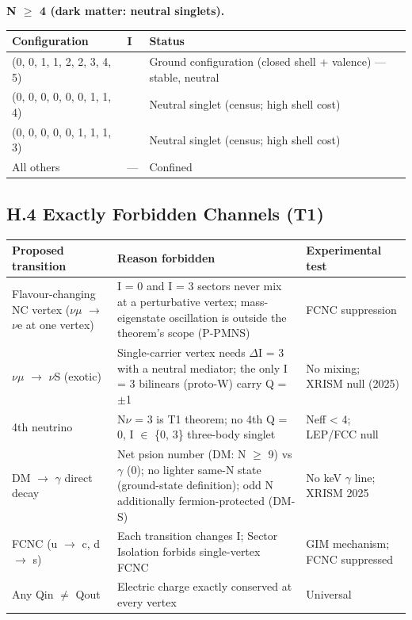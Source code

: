 \documentclass[11pt,letterpaper]{article}
\begin{document}
\noindent \textbf{N $\ge$ 4 (dark matter: neutral singlets).}

\begin{footnotesize}\begin{longtable}{|>{\raggedright\arraybackslash}p{}|>{\raggedright\arraybackslash}p{}|>{\raggedright\arraybackslash}p{}|}
\hline
\textbf{Configuration} & \textbf{I} & \textbf{Status} \\ \hline
(0, 0, 1, 1, 2, 2, 3, 4, 5) & 0 & Ground configuration (closed shell + valence) --- stable, neutral \\ \hline
(0, 0, 0, 0, 0, 0, 1, 1, 4) & 0 & Neutral singlet (census; high shell cost) \\ \hline
(0, 0, 0, 0, 0, 1, 1, 1, 3) & 0 & Neutral singlet (census; high shell cost) \\ \hline
All others & --- & Confined \\ \hline
\end{longtable}\end{footnotesize}

\subsection*{H.4  Exactly Forbidden Channels (T1)}

\begin{footnotesize}\begin{longtable}{|>{\raggedright\arraybackslash}p{}|>{\raggedright\arraybackslash}p{}|>{\raggedright\arraybackslash}p{}|}
\hline
\textbf{Proposed transition} & \textbf{Reason forbidden} & \textbf{Experimental test} \\ \hline
Flavour-changing NC vertex ($\nu$$\mu$ $\to$ $\nu$e at one vertex) & I = 0 and I = 3 sectors never mix at a perturbative vertex; mass-eigenstate oscillation is outside the theorem's scope (P-PMNS) & FCNC suppression \\ \hline
$\nu$$\mu$ $\to$ $\nu$S (exotic) & Single-carrier vertex needs $\Delta$I = 3 with a neutral mediator; the only I = 3 bilinears (proto-W) carry Q = $\pm$1 & No mixing; XRISM null (2025) \\ \hline
4th neutrino & N$\nu$ = 3 is T1 theorem; no 4th Q = 0, I $\in$ \{0, 3\} three-body singlet & Neff < 4; LEP/FCC null \\ \hline
DM $\to$ $\gamma$ direct decay & Net psion number (DM: N $\ge$ 9) vs $\gamma$ (0); no lighter same-N state (ground-state definition); odd N additionally fermion-protected (DM-S) & No keV $\gamma$ line; XRISM 2025 \\ \hline
FCNC (u $\to$ c, d $\to$ s) & Each transition changes I; Sector Isolation forbids single-vertex FCNC & GIM mechanism; FCNC suppressed \\ \hline
Any Qin $\ne$ Qout & Electric charge exactly conserved at every vertex & Universal \\ \hline
\end{longtable}\end{footnotesize}
\end{document}

